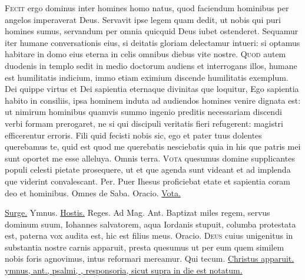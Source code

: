 \begin{multicols*}{2}
\lettrine[lines=2]{\zallmancaps \color{Blue} F}{ecit} ergo dominus inter homines homo natus, quod faciendum hominibus per angelos imperaverat Deus. Servavit ipse legem quam dedit, ut nobis qui puri homines sumus, servandum per omnia quicquid Deus iubet ostenderet. Sequamur iter humane conversationis eius, si deitatis gloriam delectamur intueri: si optamus habitare in domo eius eterna in celis omnibus diebus vite nostre.
\lettrine[lines=2]{\zallmancaps \color{Red} Q}{uod} autem duodenis in templo sedit in medio doctorum audiens et interrogans illos, humane est humilitatis indicium, immo etiam eximium discende humilitatis exemplum. Dei quippe virtus et Dei sapientia eternaque divinitas que loquitur, Ego sapientia habito in consiliis, ipsa hominem induta ad audiendos homines venire dignata est: ut nimirum hominibus quamvis summo ingenio preditis necessariam discendi verbi formam prerogaret, ne si qui discipuli veritatis fieri refugerent: magistri efficerentur erroris.
 Fili quid fecisti nobis sic, ego et pater tuus dolentes querebamus te, quid est quod me querebatis nesciebatis quia in his que patris mei sunt oportet me esse alleluya. \V Omnis terra.
\lettrine[lines=2]{\zallmancaps \color{Blue} V}{ota} \hypertarget{vota-quesumus-epiphanie}{quesumus} domine supplicantes populi celesti pietate prosequere, ut et que agenda sunt videant et ad implenda que viderint convalescant. Per.
 Puer Ihesus proficiebat etate et sapientia coram deo et hominibus. \V Omnes de Saba. {\color{Red} Oracio.} \hyperlink{vota-quesumus-epiphanie}{Vota.}
{\color{Red} }
\par {} \hyperlink{surge-capitulum}{Surge.} {\color{Red} Ymnus.} \hyperlink{hostis-herodes}{Hostis.} \V Reges. {\color{Red} Ad Mag. Ant.} Baptizat miles regem, servus dominum suum, Iohannes salvatorem, aqua Iordanis stupuit, columba protestata est, paterna vox audita est, hic est filius meus. {\color{Red} Oracio.}
\lettrine[lines=2]{\zallmancaps \color{Red} D}{eus} \hypertarget{deus-cuius-unigenitus-epiphanie}{cuius} unigenitus in substantia nostre carnis apparuit, presta quesumus ut per eum quem similem nobis foris agnovimus, intus reformari mereamur. Qui tecum.
 \hyperlink{christus-apparuit-invitatorium}{Christus apparuit.} \ul{ymnus, ant., psalmi, \Vbar , responsoria, sicut supra in die est notatum.}

\end{multicols*}
